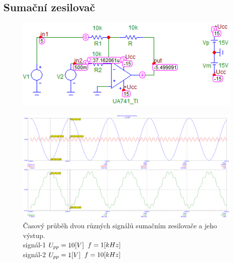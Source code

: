 \documentclass{article}
\begin{document}
\subsection*{Sumační zesilovač}
\begin{figure}[H]
  \begin{minipage}[t]{\textwidth}
    \includegraphics[width=\textwidth]{PC/ukol2/DC.png}
  \end{minipage}
\end{figure}

\begin{figure}[H]
  \begin{minipage}[t]{\textwidth}
    \centering
    \includegraphics[width=\textwidth]{PC/ukol2/transient2.png}
    Časový průběh dvou různých signálů sumačním zesilovače a jeho výstup.\\
    signál-1 \(U_{pp} = 10\-[V]\) \(f = 1\-[kHz]\)\\
    signál-2 \(U_{pp} = 1\-[V]\) \(f = 10\-[kHz]\)
  \end{minipage}
\end{figure}
\end{document}
